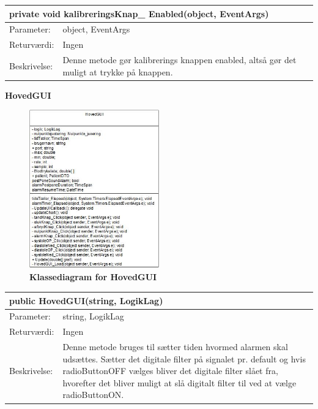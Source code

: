 \begin{table}[H]
\label{tab:tabel2}
\begin{tabular}{| l | p{13cm} |}
   \hline
   \multicolumn{2}{|l|}{private void kalibreringsKnap\_ Enabled(object, EventArgs)} \\ \hline
   Parameter: & object, EventArgs\\ \hline
   Returværdi: & Ingen \\ \hline
   Beskrivelse: & Denne metode gør kalibrerings knappen enabled, altså gør det muligt at trykke på knappen.\\ \hline
\end{tabular}
\end{table}
\textbf{HovedGUI}
\begin{figure}[H]
\includegraphics[width =0.5\textwidth , center]{billeder/klassediagramHoved}
\caption{\textbf{Klassediagram for HovedGUI}}
\end{figure}
\begin{table}[H]
\label{tab:tabel2}
\begin{tabular}{| l | p{13cm} |}
   \hline
   \multicolumn{2}{|l|}{public HovedGUI(string, LogikLag)} \\ \hline
   Parameter: & string, LogikLag\\ \hline
   Returværdi: & Ingen \\ \hline
   Beskrivelse: & Denne metode bruges til sætter tiden hvormed alarmen skal udsættes. Sætter det digitale filter på signalet pr. default og hvis radioButtonOFF vælges bliver det digitale filter slået fra, hvorefter det bliver muligt at slå digitalt filter til ved at vælge radioButtonON.\\ \hline
\end{tabular}
\end{table}
